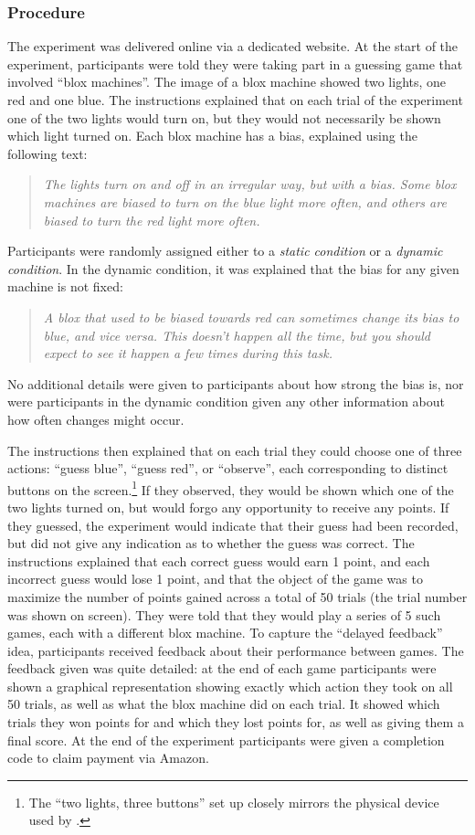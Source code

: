 \documentclass[authoryear]{elsarticle}
\newcommand{\subsubsectionX}[1]{\subsubsection{#1}}
\begin{document}
\subsubsectionX{Procedure} The experiment was delivered online via a dedicated website. At the start of the experiment, participants were told they were taking part in a guessing game that involved ``blox machines''. The image of a blox machine showed two lights, one red and one blue. The instructions explained that on each trial of the experiment one of the two lights would turn on, but they would not necessarily be shown which light turned on. Each blox machine has a bias, explained using the following text:
\begin{quote}
{\it The lights turn on and off in an irregular way, but with a bias. Some blox machines are biased to turn on the blue light more often, and others are biased to turn the red light more often.}
\end{quote}
Participants were randomly assigned either to a {\it static condition} or a {\it dynamic condition}. In the dynamic condition, it was explained that the bias for any given machine is not fixed:
\begin{quote}
{\it A blox that used to be biased towards red can sometimes change its bias to blue, and vice versa. This doesn't happen all the time, but you should expect to see it happen a few times during this task.}
\end{quote}
No additional details were given to participants about how strong the bias is, nor were participants in the dynamic condition given any other information about how often changes might occur.

The instructions then explained that on each trial they could choose one of three actions: ``guess blue'', ``guess red'', or ``observe'', each corresponding to distinct buttons on the screen.\footnote{The ``two lights, three buttons'' set up closely mirrors the physical device used by \citet{tversky_information_1966}.} If they observed, they would be shown which one of the two lights turned on, but would forgo any opportunity to receive any points. If they guessed, the experiment would indicate that their guess had been recorded, but did not give any indication as to whether the guess was correct. The instructions explained that each correct guess would earn 1 point, and each incorrect guess would lose 1 point, and that the object of the game was to maximize the number of points gained across a total of 50 trials (the trial number was shown on screen). They were told that they would play a series of 5 such games, each with a different blox machine. To capture the ``delayed feedback'' idea, participants received feedback about their performance between games. The feedback given was quite detailed: at the end of each game participants were shown a graphical representation showing exactly which action they took on all 50 trials, as well as what the blox machine did on each trial. It showed which trials they won points for and which they lost points for, as well as giving them a final score. At the end of the experiment participants were given a completion code to claim payment via Amazon.
\end{document}
